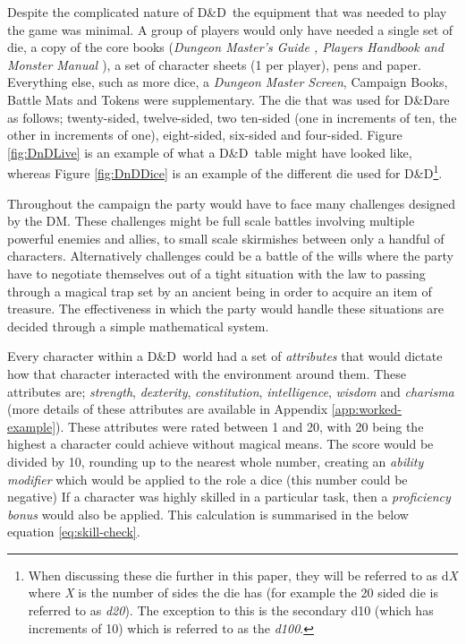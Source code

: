 \documentclass[final]{cmpreport}
\newcommand{\dnd}{D\&D}
\begin{document}
			Despite the complicated nature of \dnd \ the equipment that was needed to play the game was minimal. A group of players would only have needed a single set of die, a copy of the core books (\emph{Dungeon Master's Guide \citep{DMGuide}, Players Handbook and Monster Manual \citep{MonsterManual}}), a set of character sheets (1 per player), pens and paper. Everything else, such as more dice, a \emph{Dungeon Master Screen}, Campaign Books, Battle Mats and Tokens were supplementary. The die that was used for \dnd are as follows; twenty-sided, twelve-sided, two ten-sided (one in increments of ten, the other in increments of one), eight-sided, six-sided and four-sided. Figure \ref{fig:DnDLive} is an example of what a \dnd \ table might have looked like, whereas Figure \ref{fig:DnDDice} is an example of the different die used for \dnd \footnote{When discussing these die further in this paper, they will be referred to as d\emph{X} where \emph{X} is the number of sides the die has (for example the 20 sided die is referred to as \emph{d20}). The exception to this is the secondary d10 (which has increments of 10) which is referred to as the \emph{d100}.}.
			
			Throughout the campaign the party would have to face many challenges designed by the DM. These challenges might be full scale battles involving multiple powerful enemies and allies, to small scale skirmishes between only a handful of characters. Alternatively challenges could be a battle of the wills where the party have to negotiate themselves out of a tight situation with the law to passing through a magical trap set by an ancient being in order to acquire an item of treasure. The effectiveness in which the party would handle these situations are decided through a simple mathematical system. 
			
			Every character within a \dnd \ world had a set of \emph{attributes} that would dictate how that character interacted with the environment around them. These attributes are; \emph{strength}, \emph{dexterity}, \emph{constitution}, \emph{intelligence}, \emph{wisdom} and \emph{charisma} (more details of these attributes are available in Appendix \ref{app:worked-example}). These attributes were rated between 1 and 20, with 20 being the highest a character could achieve without magical means. The score would be divided by 10, rounding up to the nearest whole number, creating an \emph{ability modifier} which would be applied to the role a dice (this number could be negative) If a character was highly skilled in a particular task, then a \emph{proficiency bonus} would also be applied. This calculation is summarised in the below equation \ref{eq:skill-check}. 
			
\end{document}

